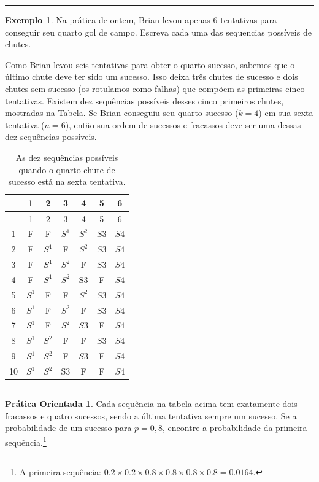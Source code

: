 \documentclass[
]{book}
\theoremstyle{definition}
\theoremstyle{definition}
\newtheorem{example}{Exemplo}[chapter]
\theoremstyle{definition}
\newtheorem{exercise}{Prática Orientada}[chapter]
\theoremstyle{definition}
\theoremstyle{remark}
\begin{document}
\begin{center}\rule{0.5\linewidth}{0.5pt}\end{center}

\begin{example}
\protect\hypertarget{exm:unnamed-chunk-143}{}{\label{exm:unnamed-chunk-143} }Na prática de ontem, Brian levou apenas 6 tentativas para conseguir seu quarto gol de campo. Escreva cada uma das sequencias possíveis de chutes.
\end{example}

Como Brian levou seis tentativas para obter o quarto sucesso, sabemos que o último chute deve ter sido um sucesso. Isso deixa três chutes de sucesso e dois chutes sem sucesso (os rotulamos como falhas) que compõem as primeiras cinco tentativas. Existem dez sequências possíveis desses cinco primeiros chutes, mostradas na Tabela. Se Brian conseguiu seu quarto sucesso (\(k=4\)) em sua sexta tentativa (\(n=6\)), então sua ordem de sucessos e fracassos deve ser uma dessas dez sequências possíveis.

\begin{longtable}[]{@{}ccccccc@{}}
\caption{As dez sequências possíveis quando o quarto chute de sucesso está na sexta tentativa.}\tabularnewline
\toprule
& 1 & 2 & 3 & 4 & 5 & 6\tabularnewline
\midrule
\endfirsthead
\toprule
& 1 & 2 & 3 & 4 & 5 & 6\tabularnewline
\midrule
\endhead
1 & F & F & \(S^1\) & \(S^2\) & \(S3\) & \(S4\)\tabularnewline
2 & F & \(S^1\) & F & \(S^2\) & \(S3\) & \(S4\)\tabularnewline
3 & F & \(S^1\) & \(S^2\) & F & \(S3\) & \(S4\)\tabularnewline
4 & F & \(S^1\) & \(S^2\) & S3 & F & \(S4\)\tabularnewline
5 & \(S^1\) & F & F & \(S^2\) & \(S3\) & \(S4\)\tabularnewline
6 & \(S^1\) & F & \(S^2\) & F & \(S3\) & \(S4\)\tabularnewline
7 & \(S^1\) & F & \(S^2\) & \(S3\) & F & \(S4\)\tabularnewline
8 & \(S^1\) & \(S^2\) & F & F & \(S3\) & \(S4\)\tabularnewline
9 & \(S^1\) & \(S^2\) & F & \(S3\) & F & \(S4\)\tabularnewline
10 & \(S^1\) & \(S^2\) & S3 & F & F & \(S4\)\tabularnewline
\bottomrule
\end{longtable}

\begin{center}\rule{0.5\linewidth}{0.5pt}\end{center}

\begin{exercise}
\protect\hypertarget{exr:unnamed-chunk-144}{}{\label{exr:unnamed-chunk-144} }Cada sequência na tabela acima tem exatamente dois fracassos e quatro sucessos, sendo a última tentativa sempre um sucesso. Se a probabilidade de um sucesso para \(p=0,8\), encontre a probabilidade da primeira sequência.\footnote{A primeira sequência: \(0.2\times0.2\times0.8\times0.8\times0.8\times0.8 = 0.0164\).}
\end{exercise}
\end{document}
